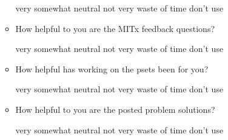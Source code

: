 \documentclass[handout]{mcs}
\begin{document}
\begin{itemize}
\begin{itemize}
\begin{center}
very\hspace{0.3in} somewhat \hspace{0.3in} neutral\hspace{0.3in} not
very \hspace{0.3in} waste of time  \hspace{0.7in}don't use
\end{center}

\item How helpful to you are the MITx feedback questions?

\begin{center}
very\hspace{0.3in} somewhat \hspace{0.3in} neutral\hspace{0.3in} not
very \hspace{0.3in} waste of time  \hspace{0.7in}don't use
\end{center}

\item How helpful has working on the psets been for you?
 
\begin{center}
very\hspace{0.3in} somewhat \hspace{0.3in} neutral\hspace{0.3in} not
very \hspace{0.3in} waste of time  \hspace{0.7in}don't use
\end{center}


\item How helpful to you are the posted problem solutions?
 
\begin{center}
very\hspace{0.3in} somewhat \hspace{0.3in} neutral\hspace{0.3in} not
very \hspace{0.3in} waste of time  \hspace{0.7in}don't use
\end{center}

\iffalse
\begin{center}
very well\hspace{0.3in} mostly\hspace{0.3in} adequately\hspace{0.3in}
partially\hspace{0.3in} poorly  \hspace{0.7in} don't use
\end{center}
\fi


\end{itemize}
\end{itemize}
\end{document}
